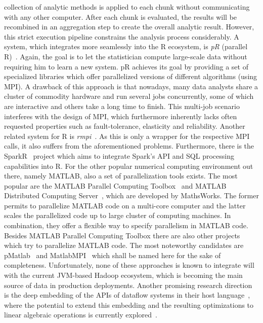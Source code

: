 collection of analytic methods is applied to each chunk without communicating with any other computer. After each chunk is evaluated, the results will be recombined in an aggregation step to create the overall analytic result. However, this strict execution pipeline constrains the analysis process considerably. A system, which integrates more seamlessly into the R ecosystem, is {\em pR} (parallel R)~\cite{samatova:2009a}. Again, the goal is to let the statistician compute large-scale data without requiring him to learn a new system. pR achieves its goal by providing a set of specialized libraries which offer parallelized versions of different algorithms (using MPI). A drawback of this approach is that nowadays, many data analysts share a cluster of commodity hardware and run several jobs concurrently, some of which are interactive and others take a long time to finish. This multi-job scenario interferes with the design of MPI, which furthermore inherently lacks often requested properties such as fault-tolerance, elasticity and reliability. Another related system for R is {\em rmpi}~\cite{rmpi}. As this is only a wrapper for the respective MPI calls, it also suffers from the aforementioned problems. Furthermore, there is the SparkR~\cite{Venkataraman2016} project which aims to integrate Spark's API and SQL processing capabilities into R. For the other popular numerical computing environment out there, namely MATLAB, also a set of parallelization tools exists. The most popular are the MATLAB Parallel Computing Toolbox~\cite{parallelComputingToolbox} and MATLAB Distributed Computing Server~\cite{distributedComputingServer}, which are developed by MathsWorks. The former permits to parallelize MATLAB code on a multi-core computer and the latter scales the parallelized code up to large cluster of computing machines. In combination, they offer a flexible way to specify parallelism in MATLAB code. Besides MATLAB Parallel Computing Toolbox there are also other projects which try to parallelize MATLAB code. The most noteworthy candidates are pMatlab~\cite{bliss:ijhpca2007a} and MatlabMPI~\cite{kepner:jpdc2004a} which shall be named here for the sake of completeness. Unfortunately, none of these approaches is known to integrate will with the current JVM-based Hadoop ecosystem, which is becoming the main source of data in production deployments. Another promising research direction is the deep embedding of the APIs of dataflow systems in their host language~\cite{Alexandrov2015}, where the potential to extend this embedding and the resulting optimizations to linear algebraic operations is currently explored~\cite{Kunft2016}.
